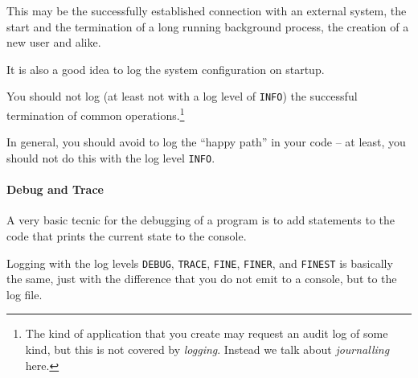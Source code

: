 \documentclass[11pt,a4paper, titlepage, parskip=half, headsepline, footsepline, cleardoublepage=current, headheight=1cm]{scrbook}
\begin{document}
This may be the successfully established connection with an external system, the start and the termination of a long running background process, the creation of a new user and alike.

It is also a good idea to log the system configuration on startup.

You should not log (at least not with a log level of \verb#INFO#) the successful termination of common operations.\footnote{The kind of application that you create may request an audit log of some kind, but this is not covered by \textit{logging}. Instead we talk about \textit{journalling} here.}

In general, you should avoid to log the “happy path” in your code – at least, you should not do this with the log level \verb#INFO#.

\paragraph{Debug and Trace} A very basic tecnic for the debugging of a program is to add statements to the code that prints the current state to the console.

Logging with the log levels \verb#DEBUG#, \verb#TRACE#, \verb#FINE#, \verb#FINER#, and \verb#FINEST# is basically the same, just with the difference that you do not emit to a console, but to the log file.
\end{document}
